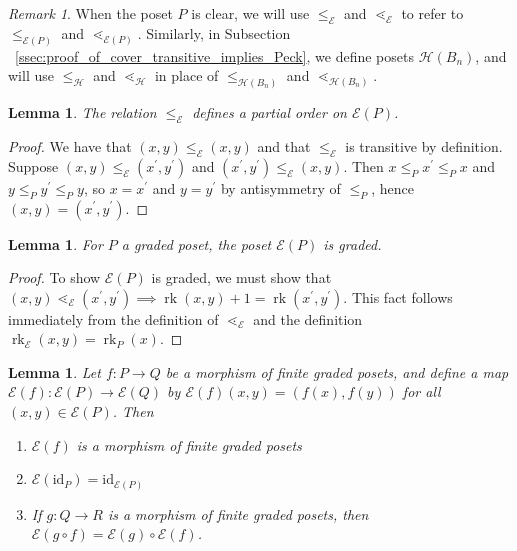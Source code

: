 \documentclass[smallextended, envcountsame, numbook]{svjour3}
\theoremstyle{plain}
\newtheorem{lem}[thm]{Lemma}
\theoremstyle{definition}
\theoremstyle{remark}
\newtheorem{rmk}[thm]{Remark}
\numberwithin{equation}{section}
\newcommand{\id}{\mathrm{id}}
\newcommand\rk{\operatorname{rk}}
\begin{document}
\begin{rmk}
When the poset $P$ is clear, we will use $\leq_{\mathcal E}$ and $\lessdot_{\mathcal E}$ to refer to $\leq_{\mathcal E(P)}$ and $\lessdot_{\mathcal E(P)}$. Similarly, in Subsection ~\ref{ssec:proof_of_cover_transitive_implies_Peck}, we define posets $\mathcal H(B_n)$, and will use $\leq_{\mathcal H}$ and $\lessdot_{\mathcal H}$ in place of $\leq_{\mathcal H(B_n)}$ and $\lessdot_{\mathcal H(B_n)}$.
\end{rmk}

\begin{lem}\label{lem:f_partial_order}
The relation $\le_{\mathcal E}$ defines a partial order on $\mathcal E(P)$.
\end{lem}

\begin{proof}
We have that $(x, y)\le_{\mathcal E} (x, y)$ and that $\le_{\mathcal E}$ is transitive by definition.  Suppose $(x, y)\le_{\mathcal E} (x^\prime, y^\prime)$ and $(x^\prime, y^\prime)\le_{\mathcal E} (x, y)$.  Then $x\le_P x^\prime \le_P x$ and $y\le_P y^\prime \le_P y$, so $x = x^\prime$ and $y=y^\prime$ by antisymmetry of $\le_P$, hence $(x, y) = (x^\prime, y^\prime)$.
\end{proof}

\begin{lem}\label{lem:FP_graded_poset}
For $P$ a graded poset, the poset $\mathcal E(P)$ is graded.
\end{lem}

\begin{proof}
To show $\mathcal E(P)$ is graded, we must show that $(x, y) \lessdot_{\mathcal E} (x^\prime, y^\prime) \implies \rk(x, y)+1 = \rk(x^\prime , y^\prime)$.  This fact follows immediately from the definition of $\lessdot_{\mathcal E}$ and the definition $\rk_{\mathcal E}(x, y) = \rk_P(x)$.
\end{proof}

\begin{lem}\label{lem:Ff_poset_morphism}
Let $f\colon P\rightarrow Q$ be a morphism of finite graded posets, and define a map $\mathcal E(f)\colon \mathcal E(P)\rightarrow \mathcal E(Q)$ by $\mathcal{E}(f)(x,y) = (f(x),f(y))$ for all $(x,y)\in \mathcal{E}(P)$.  Then

\begin{enumerate}
\item $\mathcal{E}(f)$ is a morphism of finite graded posets
\item $\mathcal{E}(\id_P) = \id_{\mathcal{E}(P)}$
\item If $g\colon Q\rightarrow R$ is a morphism of finite graded posets, then $\mathcal E(g\circ f) = \mathcal E(g)\circ\mathcal E(f)$.
\end{enumerate}
\end{lem}
\end{document}
